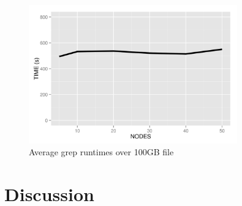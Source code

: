\documentclass{article}
\begin{document}


    \begin{figure}[H]
        \centering
        \includegraphics[width=90mm]{images/bigDataTimes.png}
        \caption{Average grep runtimes over 100GB file}
        \label{fig:bigTime}
    \end{figure}


\section{Discussion}

\end{document}
